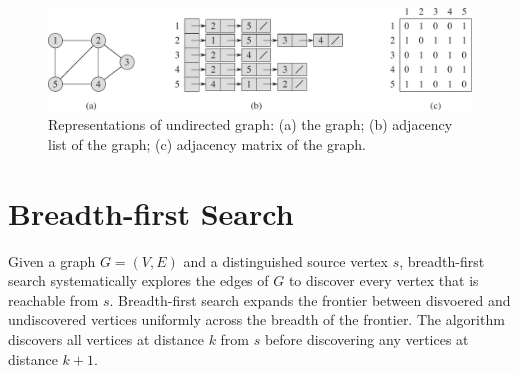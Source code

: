 \begin{figure}[htbp]
    \centering
    \includegraphics[width=\linewidth]{figures/undirected_graph.pdf}
    \caption{Representations of undirected graph: (a) the graph; (b) adjacency list of the graph; (c) adjacency matrix of the graph.}
    \label{<label>}
\end{figure}

\section{Breadth-first Search} 

Given a graph $G=(V,E)$ and a distinguished source vertex $s$, breadth-first search systematically explores the edges of $G$ to discover every vertex that is reachable from $s$. Breadth-first search expands the frontier between disvoered and undiscovered vertices uniformly across the breadth of the frontier. The algorithm discovers all vertices at distance $k$ from $s$ before discovering any vertices at distance $k+1$.

